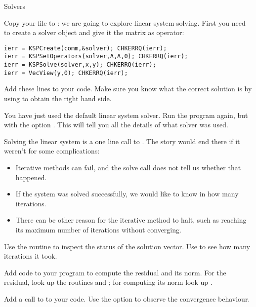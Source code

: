  {Solvers}

Copy your  file to : we are going to explore linear
system solving.
First you need to create a solver object and give
it the matrix as operator:
\begin{verbatim}
ierr = KSPCreate(comm,&solver); CHKERRQ(ierr);
ierr = KSPSetOperators(solver,A,A,0); CHKERRQ(ierr);
ierr = KSPSolve(solver,x,y); CHKERRQ(ierr);
ierr = VecView(y,0); CHKERRQ(ierr);
\end{verbatim}

\begin{exercise}
  Add these lines to your code. Make sure you know what the correct
  solution is by using  to obtain the right hand side.
\end{exercise}

You have just used the default linear system solver. Run the program
again, but with the option . This will tell you all the
details of what solver was used.

Solving the linear system is a one line call to . The
story would end there if it weren't for some complications:
\begin{itemize}
\item Iterative methods can fail, and the solve call does not tell us
  whether that happened.
\item If the system was solved successfully, we would like to know in
  how many iterations.
\item There can be other reason for the iterative method to halt, such
  as reaching its maximum number of iterations without converging.
\end{itemize}

\begin{exercise}
  Use the
  routine  to inspect the status of the
  solution vector. Use  to see how many
  iterations it took.
\end{exercise}

\begin{exercise}
  Add code to your program to compute the residual and its norm. For
  the residual, look up the routines  and ;
  for computing its norm look up .
\end{exercise}

\begin{exercise}
  Add a call to  to your code. Use the option
   to observe the convergence behaviour.
\end{exercise}


